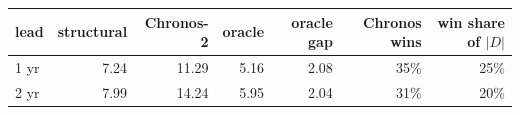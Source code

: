 \begin{tabular}{lrrrrrr}
\toprule
lead & structural & Chronos-2 & oracle & oracle gap & Chronos wins & win share of $|D|$ \\
\midrule
1 yr & 7.24 & 11.29 & 5.16 & 2.08 & 35\% & 25\% \\
2 yr & 7.99 & 14.24 & 5.95 & 2.04 & 31\% & 20\% \\
\bottomrule
\end{tabular}

